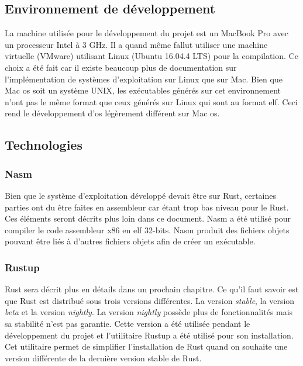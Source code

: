 
\subsection{Environnement de développement}
La machine utilisée pour le développement du projet est un MacBook Pro avec un
processeur Intel à 3 GHz. Il a quand même fallut utiliser une machine virtuelle
(VMware) utilisant Linux (Ubuntu 16.04.4 LTS) pour la compilation. Ce choix a été
fait car il existe beaucoup plus de documentation sur l'implémentation de systèmes
d'exploitation sur Linux que sur Mac. Bien que Mac \acrshort{os} soit un système UNIX, les
exécutables générés sur cet environnement n'ont pas le même format que ceux générés
sur Linux qui sont au format \acrshort{elf}. Ceci rend le développement d'\acrshort{os} légèrement
différent sur Mac \acrshort{os}.


\subsection{Technologies}
\subsubsection{Nasm}
Bien que le système d'exploitation développé devait être sur Rust, certaines parties
ont du être faites en assembleur car étant trop bas niveau pour le Rust. Ces éléments
seront décrits plus loin dans ce document. Nasm a été  utilisé pour compiler le
code assembleur x86 en \acrshort{elf} 32-bits. Nasm produit des fichiers objets pouvant être
liés à d'autres fichiers objets afin de créer un exécutable. \\

\subsubsection{Rustup}
Rust sera décrit plus en détails dans un prochain chapitre. Ce qu'il faut savoir
est que Rust est distribué sous trois versions différentes. La version \textit{stable},
la version \textit{beta} et la version \textit{nightly}. La version \textit{nightly}
possède plus de fonctionnalités mais sa stabilité n'est pas garantie. Cette version
a été utilisée pendant le développement du projet et l'utilitaire Rustup a été utilisé
pour son installation. Cet utilitaire permet de simplifier l'installation de Rust
quand on souhaite une version différente de la dernière version stable de Rust. \\

